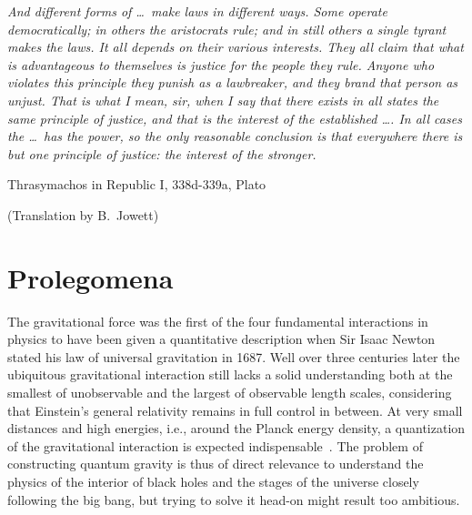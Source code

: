 \documentclass[
final,
11pt,
a4paper,
DIV=11,
headinclude=true,
footinclude=false,
bibliography=totoc,
twoside=true,  %
BCOR=5mm
]{scrbook}
\begin{document}
\begin{center}
\begin{minipage}{12cm}
  \textit{%
    And different forms of \ldots~make laws in different ways.  
    Some operate democratically; in others the aristocrats rule; 
    and in still others a single tyrant makes the laws. It all 
    depends on their various interests. They all claim that what 
    is advantageous to themselves is justice for the people they 
    rule. Anyone who violates this principle they punish as 
    a lawbreaker, and they brand that person as unjust. That is 
    what I mean, sir, when I say that there exists in all states 
    the same principle of justice, and that is the interest of 
    the established \ldots. In all cases the \ldots~has the 
    power, so the only reasonable conclusion is that everywhere 
    there is but one principle of justice: the interest of the 
    stronger.
  }

\blankline
\hfill
Thrasymachos in Republic I, 338d-339a, Plato

\hfill
{\small(Translation by B.~Jowett)}
\end{minipage}
\end{center}

\mainmatter%

\chapter{Prolegomena}

The gravitational force was the first of the four fundamental 
interactions in physics to have been given a quantitative 
description when Sir Isaac Newton stated his law of universal 
gravitation in 1687. Well over three centuries later the 
ubiquitous gravitational interaction still lacks a solid 
understanding both at the smallest of unobservable and the 
largest of observable length scales, considering that Einstein's 
general relativity remains in full control in between.  At very 
small distances and high energies, i.e., around the Planck energy 
density, a quantization of the gravitational interaction is 
expected indispensable~\cite{Padmanabhan:1987au, Kiefer:2007ria}.  
The problem of constructing quantum gravity is thus of direct 
relevance to understand the physics of the interior of black 
holes and the stages of the universe closely following the big 
bang, but trying to solve it head-on might result too ambitious.
\end{document}
